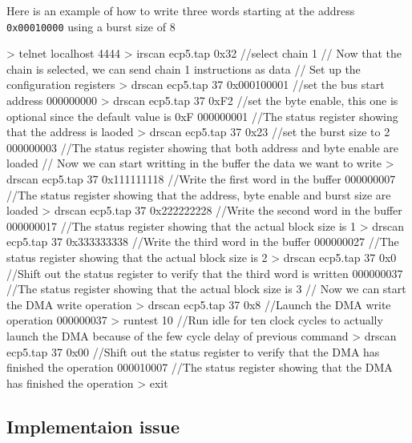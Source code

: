 \documentclass[a4paper,11pt,oneside]{report}
\begin{document}
Here is an example of how to write three words starting at the address \texttt{0x00010000} using a burst size of 8

\begin{listing}

    > telnet localhost 4444
    > irscan ecp5.tap 0x32              //select chain 1
    // Now that the chain is selected, we can send chain 1 instructions as data
    // Set up the configuration registers
    > drscan ecp5.tap 37 0x000100001    //set the bus start address
    000000000
    > drscan ecp5.tap 37 0xF2           //set the byte enable, this one is optional since the default value is 0xF
    000000001                           //The status register showing that the address is laoded
    > drscan ecp5.tap 37 0x23           //set the burst size to 2
    000000003                           //The status register showing that both address and byte enable are loaded 
    // Now we can start writting in the buffer the data we want to write
    > drscan ecp5.tap 37 0x111111118    //Write the first word in the buffer
    000000007                           //The status register showing that the address, byte enable and burst size are loaded
    > drscan ecp5.tap 37 0x222222228    //Write the second word in the buffer
    000000017                           //The status register showing that the actual block size is 1
    > drscan ecp5.tap 37 0x333333338    //Write the third word in the buffer
    000000027                           //The status register showing that the actual block size is 2
    > drscan ecp5.tap 37 0x0            //Shift out the status register to verify that the third word is written
    000000037                           //The status register showing that the actual block size is 3
    // Now we can start the DMA write operation
    > drscan ecp5.tap 37 0x8            //Launch the DMA write operation
    000000037                           
    > runtest 10                        //Run idle for ten clock cycles to actually launch the DMA because of the few cycle delay of previous command
    > drscan ecp5.tap 37 0x00           //Shift out the status register to verify that the DMA has finished the operation
    000010007                           //The status register showing that the DMA has finished the operation
    > exit
\end{listing}

\subsection{Implementaion issue}
\end{document}
